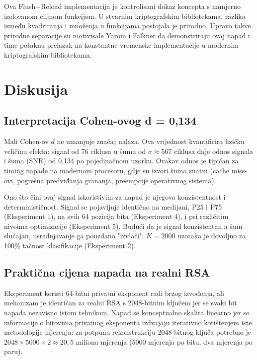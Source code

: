 Ova Flush+Reload implementacija je kontrolisani dokaz koncepta s namjerno izolovanom ciljnom funkcijom. U stvarnim kriptografskim bibliotekama, razlika između kvadriranja i množenja u funkcijama postojala je prirodno. 
Upravo takve prirodne separacije su motivisale Yarom i Falkner \cite{yarom2014} da demonstriraju ovaj napad i time potaknu prelazak na konstantne vremenske implementacije u modernim kriptografskim bibliotekama.

\section{Diskusija}

\subsection{Interpretacija Cohen-ovog d = 0{,}134}

Mali Cohen-ov $d$ ne umanjuje značaj nalaza. Ova vrijednost kvantificira fizičku veličinu efekta: signal od 76 ciklusa u šumu od $\sigma \approx 567$ ciklusa daje odnos signala i šuma (SNR) od 0{,}134 po pojedinačnom uzorku. Ovakav odnos je tipičan za timing napade na modernom procesoru, gdje su izvori šuma znatni (cache miss-ovi, pogrešna predviđanja grananja, preempcije operativnog sistema).

Ono što čini ovaj signal iskoristivim za napad je njegova konzistentnost i determinističnost. Signal se pojavljuje identično na medijani, P25 i P75 (Eksperiment 1), na svih 64 pozicija bita (Eksperiment 4), i pri različitim nivoima optimizacije (Eksperiment 5). Budući da je signal konzistentan a šum slučajan, usrednjavanje ga pouzdano "izvlači": $K = 2000$ uzoraka je dovoljno za 100\% tačnost klasifikacije (Eksperiment 2).


\subsection{Praktična cijena napada na realni RSA}

Eksperiment koristi 64-bitni privatni eksponent radi brzog izvođenja, ali mehanizam je identičan za realni RSA s 2048-bitnim ključem jer se svaki bit napada nezavisno istom tehnikom. Napad se konceptualno skalira linearno jer se informacije o bitovima privatnog eksponenta izdvajaju iterativno korištenjem iste metodologije mjerenja: za potpunu rekonstrukciju 2048-bitnog ključa potrebno je $2048 \times 5000 \times 2 \approx 20{,}5$ miliona mjerenja (5000 mjerenja po bitu, dva mjerenja po paru).

